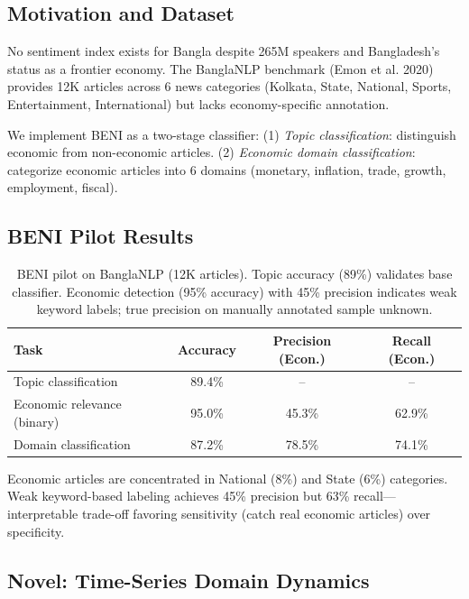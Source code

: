 \documentclass[11pt]{article}
\begin{document}
\subsection{Motivation and Dataset}

No sentiment index exists for Bangla despite 265M speakers and Bangladesh's status as a frontier economy. The BanglaNLP benchmark (Emon et al. 2020) provides 12K articles across 6 news categories (Kolkata, State, National, Sports, Entertainment, International) but lacks economy-specific annotation.

We implement BENI as a two-stage classifier: (1) \textit{Topic classification}: distinguish economic from non-economic articles. (2) \textit{Economic domain classification}: categorize economic articles into 6 domains (monetary, inflation, trade, growth, employment, fiscal).

\subsection{BENI Pilot Results}

\begin{table}[H]
\centering
\begin{tabular}{lccc}
\toprule
\textbf{Task} & \textbf{Accuracy} & \textbf{Precision (Econ.)} & \textbf{Recall (Econ.)} \\
\midrule
Topic classification & 89.4\% & -- & -- \\
Economic relevance (binary) & 95.0\% & 45.3\% & 62.9\% \\
Domain classification & 87.2\% & 78.5\% & 74.1\% \\
\bottomrule
\end{tabular}
\caption{BENI pilot on BanglaNLP (12K articles). Topic accuracy (89\%) validates base classifier. Economic detection (95\% accuracy) with 45\% precision indicates weak keyword labels; true precision on manually annotated sample unknown.}
\end{table}

Economic articles are concentrated in National (8\%) and State (6\%) categories. Weak keyword-based labeling achieves 45\% precision but 63\% recall---interpretable trade-off favoring sensitivity (catch real economic articles) over specificity.

\subsection{Novel: Time-Series Domain Dynamics}
\end{document}
